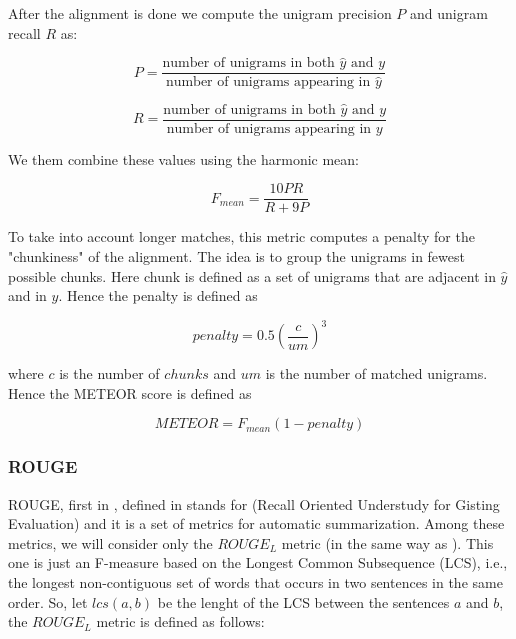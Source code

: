 After the alignment is done we compute the unigram precision $P$ and unigram recall $R$ as:

\begin{equation*}
P = \frac{\text{number of } \text{unigrams in both } \hat{y} \text{ and } y}{\text{number of } \text{unigrams appearing in } \hat{y}}
\end{equation*}    


\begin{equation*}
R = \frac{\text{number of } \text{unigrams in both } \hat{y} \text{ and } y}{\text{number of } \text{unigrams appearing in } y}
\end{equation*}    

We them combine these values using the harmonic mean:

\begin{equation*}
F_{mean} = \frac{10 P R}{R + 9P}
\end{equation*}

To take into account longer matches, this metric computes a penalty for the "chunkiness" of the alignment. The idea is to group the unigrams in fewest possible chunks. Here chunk is defined as a set of unigrams that are adjacent in $\hat{y}$ and in $y$. Hence the penalty is defined as

\begin{equation*}
penalty = 0.5 \left( \frac{c}{um} \right)^{3}
\end{equation*}

where $c$ is the number of $chunks$ and $um$ is the number of matched unigrams. Hence the METEOR score is defined as

\begin{equation*}
METEOR = F_{mean} (1 - penalty)
\end{equation*}

\subsubsection{ROUGE}

ROUGE, first in \cite{Lin}, defined in stands for (Recall Oriented  Understudy  for  Gisting  Evaluation) and it is a set of metrics for automatic summarization. Among these metrics, we will consider only the $ROUGE_L$ metric (in the same way as \cite{Lowe:2016}). This one is just an F-measure based on the Longest Common Subsequence (LCS), i.e., the longest non-contiguous set of words that occurs in two sentences in the same order. So, let $lcs(a,b)$ be the lenght of the LCS between the sentences $a$ and $b$, the $ROUGE_L$ metric is defined as follows: 

